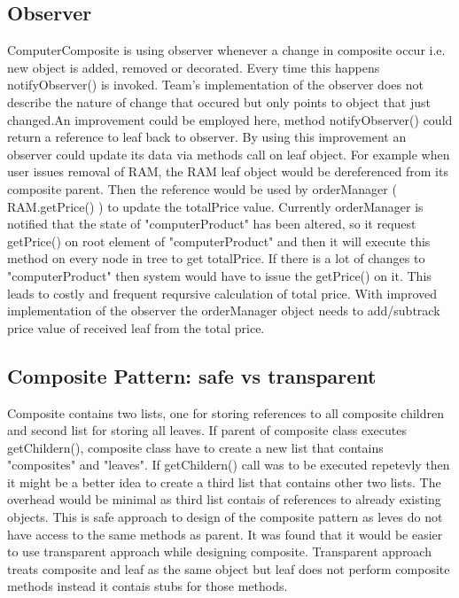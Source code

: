 \documentclass[pdftex,11pt,a4paper]{article}
\begin{document}
\subsection{Observer}
ComputerComposite is using observer whenever a change in composite occur i.e. new object is added,  removed or decorated. Every time this happens notifyObserver() is invoked. Team's implementation of the observer does not describe the nature of change that occured but only points to object that just changed.An improvement could be employed here, method notifyObserver() could return a reference to leaf back to observer. By using this improvement an observer could update its data via methods call on leaf object. For example when user issues removal of RAM, the RAM leaf object would be dereferenced from its composite parent. Then the reference would be used by orderManager ( RAM.getPrice() ) to update the totalPrice value.
Currently orderManager is notified that the state of "computerProduct" has been altered, so it request getPrice() on root element of "computerProduct" and then it will execute this method on every node in tree to get totalPrice.
If there is a lot of changes to "computerProduct" then system would have to issue the getPrice() on it. This leads to costly and frequent reqursive calculation of total price. With improved implementation of the observer the orderManager object needs to add/subtrack price value of received leaf from the total price.

\subsection{Composite Pattern: safe vs transparent}
Composite contains two lists, one for storing references to all composite children and second list for storing all leaves. If parent of composite class executes getChildern(), composite class have to create a new list that contains "composites" and "leaves".
If getChildern() call was to be executed repetevly then it might be a better idea to create a third list that contains other two lists. The overhead would be minimal as third list contais of references to already existing objects.
This is safe approach to design of the composite pattern as leves do not have access to the same methods as parent. It was found that it would be easier to use transparent approach while designing composite. Transparent approach treats composite and leaf as the same object but leaf does not perform composite methods instead it contais stubs for those methods.
\end{document}
